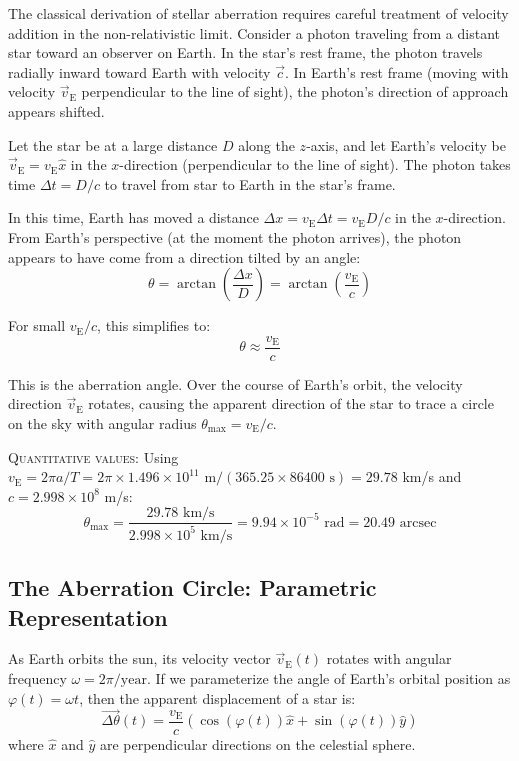 The classical derivation of stellar aberration requires careful treatment of velocity addition in the non-relativistic limit. Consider a photon traveling from a distant star toward an observer on Earth. In the star's rest frame, the photon travels radially inward toward Earth with velocity $\vec{c}$. In Earth's rest frame (moving with velocity $\vec{v}_{\text{E}}$ perpendicular to the line of sight), the photon's direction of approach appears shifted.

Let the star be at a large distance $D$ along the $z$-axis, and let Earth's velocity be $\vec{v}_{\text{E}} = v_{\text{E}} \hat{x}$ in the $x$-direction (perpendicular to the line of sight). The photon takes time $\Delta t = D/c$ to travel from star to Earth in the star's frame.

In this time, Earth has moved a distance $\Delta x = v_{\text{E}} \Delta t = v_{\text{E}} D / c$ in the $x$-direction. From Earth's perspective (at the moment the photon arrives), the photon appears to have come from a direction tilted by an angle:
\[
  \theta = \arctan\left(\frac{\Delta x}{D}\right) = \arctan\left(\frac{v_{\text{E}}}{c}\right)
\]

For small $v_{\text{E}}/c$, this simplifies to:
\[
  \theta \approx \frac{v_{\text{E}}}{c}
\]

This is the aberration angle. Over the course of Earth's orbit, the velocity direction $\vec{v}_{\text{E}}$ rotates, causing the apparent direction of the star to trace a circle on the sky with angular radius $\theta_{\max} = v_{\text{E}} / c$.

\textsc{Quantitative values:} Using $v_{\text{E}} = 2\pi a / T = 2\pi \times 1.496 \times 10^{11} \text{ m} / (365.25 \times 86400 \text{ s}) = 29.78$ km/s and $c = 2.998 \times 10^8$ m/s:
\[
  \theta_{\text{max}} = \frac{29.78 \text{ km/s}}{2.998 \times 10^5 \text{ km/s}} = 9.94 \times 10^{-5} \text{ rad} = 20.49 \text{ arcsec}
\]

\subsection*{The Aberration Circle: Parametric Representation}

As Earth orbits the sun, its velocity vector $\vec{v}_{\text{E}}(t)$ rotates with angular frequency $\omega = 2\pi / \text{year}$. If we parameterize the angle of Earth's orbital position as $\varphi(t) = \omega t$, then the apparent displacement of a star is:
\[
  \vec{\Delta \theta}(t) = \frac{v_{\text{E}}}{c} \left( \cos(\varphi(t)) \hat{x} + \sin(\varphi(t)) \hat{y} \right)
\]
where $\hat{x}$ and $\hat{y}$ are perpendicular directions on the celestial sphere.

